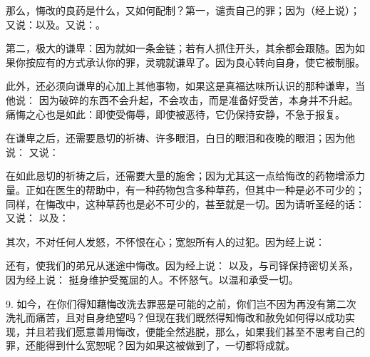 那么，悔改的良药是什么，又如何配制？第一，谴责自己的罪；因为（经上说）；又说：以及。又说：。\par

第二，极大的谦卑：因为就如一条金链；若有人抓住开头，其余都会跟随。因为如果你按应有的方式承认你的罪，灵魂就谦卑了。因为良心转向自身，使它被制服。\par

此外，还必须向谦卑的心加上其他事物，如果这是真福达味所认识的那种谦卑，当他说： 因为破碎的东西不会升起，不会攻击，而是准备好受苦，本身并不升起。痛悔之心也是如此：即使受侮辱，即使被恶待，它仍保持安静，不急于报复。\par

在谦卑之后，还需要恳切的祈祷、许多眼泪，白日的眼泪和夜晚的眼泪；因为他说： 又说：\par

在如此恳切的祈祷之后，还需要大量的施舍；因为尤其这一点给悔改的药物增添力量。正如在医生的帮助中，有一种药物包含多种草药，但其中一种是必不可少的；同样，在悔改中，这种草药也是必不可少的，甚至就是一切。因为请听圣经的话： 又说： 以及：\par

其次，不对任何人发怒，不怀恨在心；宽恕所有人的过犯。因为经上说： \par

还有，使我们的弟兄从迷途中悔改。因为经上说： 以及，与司铎保持密切关系，因为经上说： 挺身维护受冤屈的人。不怀怒气。以温和承受一切。\par

9. 如今，在你们得知藉悔改洗去罪恶是可能的之前，你们岂不因为再没有第二次洗礼而痛苦，且对自身绝望吗？但现在我们既然得知悔改和赦免如何得以成功实现，并且若我们愿意善用悔改，便能全然逃脱，那么，如果我们甚至不思考自己的罪，还能得到什么宽恕呢？因为如果这被做到了，一切都将成就。\par

